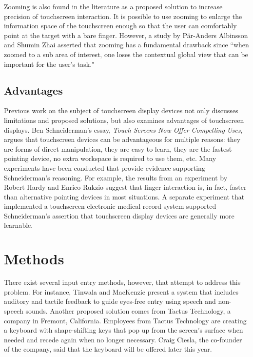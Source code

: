 \documentclass{article}
\begin{document}
Zooming is also found in the literature as a proposed solution to increase precision of touchscreen interaction. It is possible to use zooming to enlarge the information space of the touchscreen enough so that the user can comfortably point at the target with a bare finger. However, a study by P\"{a}r-Anders Albinsson and Shumin Zhai asserted that zooming has a fundamental drawback since ``when zoomed to a sub area of interest, one loses the contextual global view that can be important for the user's task."\cite{Albinsson} 

\subsection{Advantages}
Previous work on the subject of touchscreen display devices not only discusses limitations and proposed solutions, but also examines advantages of touchscreen displays. Ben Schneiderman's essay, \textit{Touch Screens Now Offer Compelling Uses},  argues that touchscreen devices can be advantageous for multiple reasons: they are forms of direct manipulation, they are easy to learn, they are the fastest pointing device, no extra workspace is required to use them, etc. \cite{73754} Many experiments have been conducted that provide evidence supporting Schneiderman's reasoning. For example, the results from an experiment by Robert Hardy and Enrico Rukzio suggest that finger interaction is, in fact, faster than alternative pointing devices in most situations.\cite{Hardy:2008:TIT:1409240.1409267} A separate experiment that implemented a touchscreen electronic medical record system supported Schneiderman's assertion that touchscreen display devices are generally more learnable.\cite{Douglas:2011:SUL:2029976.2029990}


\section{Methods}
There exist several input entry methods, however, that attempt to address this problem. For instance, Tinwala and MacKenzie present a system that includes auditory and tactile feedback to guide eyes-free entry using speech and non-speech sounds. \cite{Tinwala:2010:ETE:1868914.1868972} 
Another proposed solution comes from Tactus Technology, a company in Fremont, California. Employees from Tactus Technology are creating a keyboard with shape-shifting keys that pop up from the screen's surface when needed and recede again when no longer necessary.\cite{Tactus} Craig Ciesla, the co-founder of the company, said that the keyboard will be offered later this year. 
\end{document}
